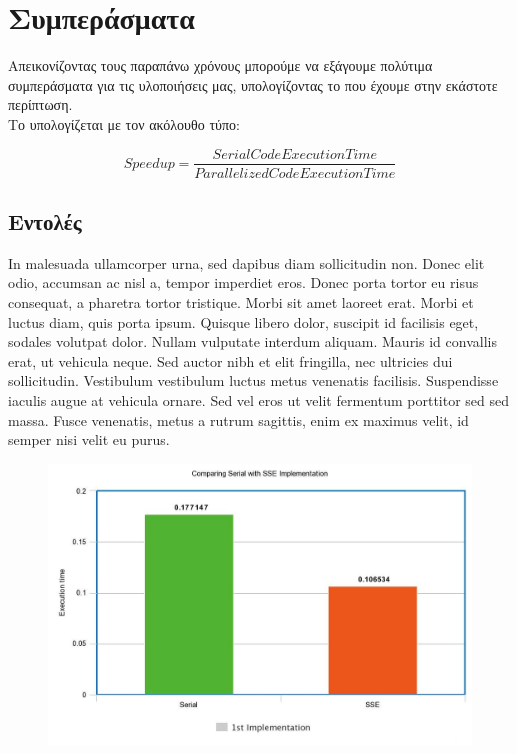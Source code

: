 \documentclass{article}
\begin{document}

\section{Συμπεράσματα}

Απεικονίζοντας τους παραπάνω χρόνους μπορούμε να εξάγουμε πολύτιμα συμπεράσματα για τις υλοποιήσεις μας, υπολογίζοντας το  που έχουμε στην εκάστοτε περίπτωση.\\
Το  υπολογίζεται με τον ακόλουθο τύπο:

\begin{equation}
     Speedup = \dfrac{Serial Code Execution Time}{Parallelized Code Execution Time}
\end{equation}


\subsection{ Εντολές}

In malesuada ullamcorper urna, sed dapibus diam sollicitudin non. Donec elit odio, accumsan ac nisl a, tempor imperdiet eros. Donec porta tortor eu risus consequat, a pharetra tortor tristique. Morbi sit amet laoreet erat. Morbi et luctus diam, quis porta ipsum. Quisque libero dolor, suscipit id facilisis eget, sodales volutpat dolor. Nullam vulputate interdum aliquam. Mauris id convallis erat, ut vehicula neque. Sed auctor nibh et elit fringilla, nec ultricies dui sollicitudin. Vestibulum vestibulum luctus metus venenatis facilisis. Suspendisse iaculis augue at vehicula ornare. Sed vel eros ut velit fermentum porttitor sed sed massa. Fusce venenatis, metus a rutrum sagittis, enim ex maximus velit, id semper nisi velit eu purus.

\begin{figure}[h!]
\centering
  \includegraphics[width=0.8\linewidth]{SSE.jpeg}
  \caption{}
\end{figure}
\end{document}
